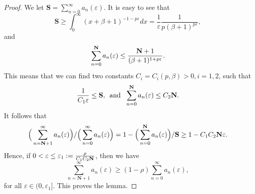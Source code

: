 \documentclass[10pt,a4paper]{amsart}
\begin{document}
\begin{proof}
We let $\mathbf{S}=\sum_{n=0}^{\infty}a_n(\varepsilon)$. It is easy to see that
\begin{equation}
\mathbf{S}\geq \int_{0}^{\infty}(x+\beta+1)^{-1-p\varepsilon}dx=\frac{1}{\varepsilon} \frac{1}{p(\beta+1)^{p\varepsilon}}, \nonumber\end{equation}
and \begin{equation}
\sum_{n=0}^{\bf{N}}a_n(\varepsilon)\leq \frac{{\bf{N}}+1}{(\beta+1)^{1+p\varepsilon}}. \nonumber
\end{equation}
This means that we can find two constants $C_i=C_i(p,\beta)>0, i=1,2$, such that
$$\frac{1}{C_1\varepsilon}\leq \mathbf{S},\,\,\,{\text{and}}\,\,\,\, \sum_{n=0}^{\bf{N}}a_n(\varepsilon)\leq C_2{\bf{N}}.$$
It follows that
\begin{equation} 
\Big(\sum_{n={\bf{N}}+1}^{\infty}a_n(\varepsilon)\Big)/\Big(\sum_{n=0}^{\infty}a_n(\varepsilon)\Big)=1-\Big(\sum_{n=0}^{\bf{N}}a_n(\varepsilon)\Big)/\mathbf{S}\geq 1-C_1 C_2{\bf{N}}\varepsilon. \nonumber 
\end{equation}
Hence, if $0<\varepsilon\leq \varepsilon_1:=\frac{\rho}{C_1C_2{\bf{N}}}$, then we have
$$\sum_{n=\mathbf{N}+1}^{\infty}a_n(\varepsilon)\geq (1-\rho)\sum_{n=0}^{\infty}a_n(\varepsilon),$$
for all $\varepsilon\in (0,\varepsilon_1]$. This proves the lemma. 
\end{proof}
\end{document}

